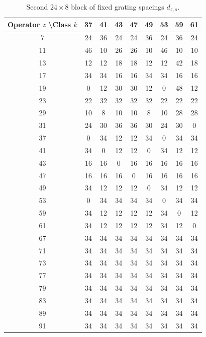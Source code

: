 \documentclass[11pt,a4paper]{article}
\begin{document}
\begin{table}[htbp]
\centering
\tiny
\begin{tabular}{c|cccccccc}
Operator \(z\) \textbackslash Class \(k\) & 37 & 41 & 43 & 47 & 49 & 53 & 59 & 61 \\
\hline
7  & 24 & 36 & 24 & 24 & 36 & 24 & 36 & 24 \\
11 & 46 & 10 & 26 & 26 & 10 & 46 & 10 & 10 \\
13 & 12 & 12 & 18 & 18 & 12 & 12 & 42 & 18 \\
17 & 34 & 34 & 16 & 16 & 34 & 34 & 16 & 16 \\
19 & 0 & 12 & 30 & 30 & 12 & 0 & 48 & 12 \\
23 & 22 & 32 & 32 & 32 & 32 & 22 & 22 & 22 \\
29 & 10 & 8 & 10 & 10 & 8 & 10 & 28 & 28 \\
31 & 24 & 30 & 36 & 36 & 30 & 24 & 30 & 0 \\
37 & 0 & 34 & 12 & 12 & 34 & 0 & 34 & 34 \\
41 & 34 & 0 & 12 & 12 & 0 & 34 & 12 & 12 \\
43 & 16 & 16 & 0 & 16 & 16 & 16 & 16 & 16 \\
47 & 16 & 16 & 16 & 0 & 16 & 16 & 16 & 16 \\
49 & 34 & 12 & 12 & 12 & 0 & 34 & 12 & 12 \\
53 & 0 & 34 & 34 & 34 & 34 & 0 & 34 & 34 \\
59 & 34 & 12 & 12 & 12 & 12 & 34 & 0 & 12 \\
61 & 34 & 12 & 12 & 12 & 12 & 34 & 12 & 0 \\
67 & 34 & 34 & 34 & 34 & 34 & 34 & 34 & 34 \\
71 & 34 & 34 & 34 & 34 & 34 & 34 & 34 & 34 \\
73 & 34 & 34 & 34 & 34 & 34 & 34 & 34 & 34 \\
77 & 34 & 34 & 34 & 34 & 34 & 34 & 34 & 34 \\
79 & 34 & 34 & 34 & 34 & 34 & 34 & 34 & 34 \\
83 & 34 & 34 & 34 & 34 & 34 & 34 & 34 & 34 \\
89 & 34 & 34 & 34 & 34 & 34 & 34 & 34 & 34 \\
91 & 34 & 34 & 34 & 34 & 34 & 34 & 34 & 34 \\
\end{tabular}
\caption{Second \(24 \times 8\) block of fixed grating spacings \(d_{z,o}\).}
\label{tab:d-block2}
\end{table}
\end{document}
